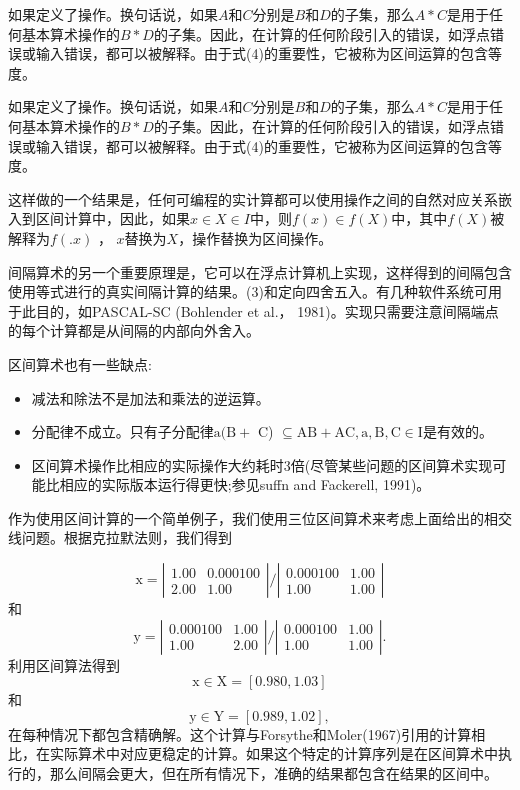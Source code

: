 \begin{CJK}{UTF8}{gbsn}
如果定义了操作。换句话说，如果$A$和$C$分别是$B$和$D$的子集，那么$A * C$是用于任何基本算术操作的$B * D$的子集。因此，在计算的任何阶段引入的错误，如浮点错误或输入错误，都可以被解释。由于式(4)的重要性，它被称为区间运算的包含等度。

如果定义了操作。换句话说，如果$A$和$C$分别是$B$和$D$的子集，那么$A * C$是用于任何基本算术操作的$B * D$的子集。因此，在计算的任何阶段引入的错误，如浮点错误或输入错误，都可以被解释。由于式(4)的重要性，它被称为区间运算的包含等度。

这样做的一个结果是，任何可编程的实计算都可以使用操作之间的自然对应关系嵌入到区间计算中，因此，如果$x \in X \in I$中，则$f(x) \in f(X)$中，其中$f(X)$被解释为$f(. x)$ ， $x$替换为$X$，操作替换为区间操作。

间隔算术的另一个重要原理是，它可以在浮点计算机上实现，这样得到的间隔包含使用等式进行的真实间隔计算的结果。(3)和定向四舍五入。有几种软件系统可用于此目的，如PASCAL-SC (Bohlender et al.， 1981)。实现只需要注意间隔端点的每个计算都是从间隔的内部向外舍入。

区间算术也有一些缺点:


\begin{itemize}
\item 减法和除法不是加法和乘法的逆运算。

\item 分配律不成立。只有子分配律$\mathrm{a}(\mathrm{B}+$ C) $\subseteq \mathrm{AB}+\mathrm{AC}, \mathrm{a}, \mathrm{B}, \mathrm{C} \in\mathrm{I}$是有效的。

\item 区间算术操作比相应的实际操作大约耗时3倍(尽管某些问题的区间算术实现可能比相应的实际版本运行得更快;参见suffn and Fackerell, 1991)。
	


\end{itemize}

作为使用区间计算的一个简单例子，我们使用三位区间算术来考虑上面给出的相交线问题。根据克拉默法则，我们得到


$$
\mathrm{x}=\left|\begin{array}{cc}
1.00 & 0.000100 \\
2.00 & 1.00
\end{array}\right| /\left|\begin{array}{cc}
0.000100 & 1.00 \\
1.00 & 1.00
\end{array}\right|
$$
和
$$
\mathrm{y}=\left| \begin{array}{cc}
0.000100 & 1.00 \\
1.00 & 2.00
\end{array}\right| / \left|\begin{array}{cc}
0.000100 & 1.00 \\
1.00 & 1.00
\end{array}\right|.
$$
利用区间算法得到
$$
\mathrm{x} \in \mathrm{X}=[0.980,1.03]
$$
和
$$
\mathrm{y} \in \mathrm{Y}=[0.989,1.02],
$$
在每种情况下都包含精确解。这个计算与Forsythe和Moler(1967)引用的计算相比，在实际算术中对应更稳定的计算。如果这个特定的计算序列是在区间算术中执行的，那么间隔会更大，但在所有情况下，准确的结果都包含在结果的区间中。


\end{CJK}
